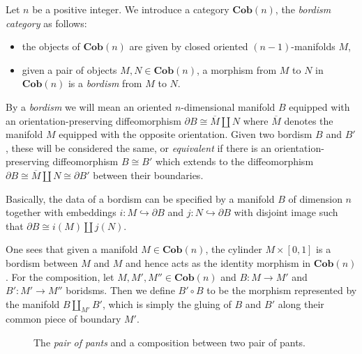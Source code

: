 \documentclass[a4paper,11pt]{article}
\theoremstyle{plain}
\theoremstyle{definition}
\theoremstyle{remark}
\begin{document}
Let $n$ be a positive integer. We introduce a category $\textbf{Cob}(n)$, the \textit{bordism category} as follows: 
\begin{itemize}
    \item the objects of $\textbf{Cob}(n)$ are given by closed oriented $(n-1)$-manifolds $M$,
    \item given a pair of objects $M, N \in \textbf{Cob}(n)$, a morphism from $M$ to $N$ in $\textbf{Cob}(n)$ is a \textit{bordism} from $M$ to $N$. 
\end{itemize}

By a \textit{bordism} we will mean an oriented $n$-dimensional manifold $B$ equipped with an orientation-preserving diffeomorphism $\partial B \cong \overline{M} \amalg N$ where $\overline{M}$ denotes the manifold $M$ equipped with the opposite orientation. Given two bordism $B$ and $B'$, these will be considered the same, or \textit{equivalent} if there is an orientation-preserving diffeomorphism $B \cong B'$ which extends to the diffeomorphism $\partial B \cong \overline{M} \amalg N \cong \partial B'$ between their boundaries. 

Basically, the data of a bordism can be specified by a manifold $B$ of dimension $n$ together with embeddings $i \colon M \hookrightarrow \partial B$ and $j \colon N \hookrightarrow \partial B$ with disjoint image such that $\partial B \cong i(M) \amalg j(N)$.  

One sees that given a manifold $M \in \textbf{Cob}(n)$, the cylinder $M \times [0,1]$ is a bordism between $M$ and $M$ and hence acts as the identity morphism in $\textbf{Cob}(n)$. For the composition, let $M, M', M'' \in \textbf{Cob}(n)$ and $B \colon M \to M'$ and $B' \colon M' \to M''$ boridsms. Then we define $B' \circ B$ to be the morphism represented by the manifold $B \coprod_{M'} B'$, which is simply the gluing of $B$ and $B'$ along their common piece of boundary $M'$. 
\begin{figure}[h]
\centering
{}
    \caption{The \textit{pair of pants} and a composition between two pair of pants.}
\end{figure}
\end{document}
